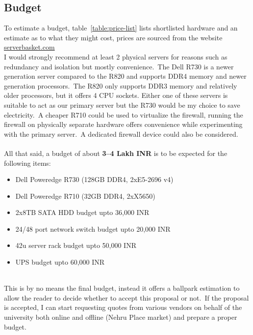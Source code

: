 \subsection{Budget}\label{subsec:budget}
To estimate a budget, table~\ref{table:price-list} lists shortlisted hardware and an estimate as to what they might
cost, prices are sourced from the website \url{serverbasket.com}
\\
I would strongly recommend at least 2 physical servers for reasons such as redundancy and isolation but mostly
convenience.\ The Dell R730 is a newer generation server compared to the R820 and supports DDR4 memory and newer
generation processors.\ The R820 only supports DDR3 memory and relatively older processors, but it offers 4 CPU sockets.
Either one of these servers is suitable to act as our primary server but the R730 would be my choice to save
electricity.\ A cheaper R710 could be used to virtualize the firewall, running the firewall on physically separate
hardware offers convenience while experimenting with the primary server.\ A dedicated firewall device could also be
considered.
\\\\
All that said, a budget of about \textbf{\large3--4 Lakh INR} is to be expected for the following items:
\begin{itemize}
    \item Dell Poweredge R730 (128GB DDR4, 2xE5-2696 v4)
    \item Dell Poweredge R710 (32GB DDR4, 2xX5650)
    \item 2x8TB SATA HDD budget upto 36,000 INR
    \item 24/48 port network switch budget upto 20,000 INR
    \item 42u server rack budget upto 50,000 INR
    \item UPS budget upto 60,000 INR
\end{itemize}
\\
This is by no means the final budget, instead it offers a ballpark estimation to allow the reader to decide whether to
accept this proposal or not.\ If the proposal is accepted, I can start requesting quotes from various vendors on
behalf of the university both online and offline (Nehru Place market) and prepare a proper budget.